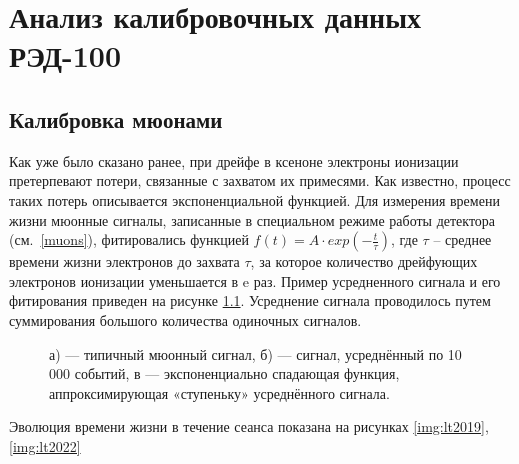 \chapter{Анализ калибровочных данных РЭД-100} 
\label{chapt3}

\section{Калибровка мюонами}
\label{sect3_1}
Как уже было сказано ранее, при дрейфе в ксеноне электроны ионизации претерпевают потери, связанные с захватом их примесями. Как известно, процесс таких потерь описывается экспоненциальной функцией. Для измерения времени жизни мюонные сигналы, записанные в специальном режиме работы детектора (см.~\ref{muons}), фитировались функцией $ f(t) = A\cdot exp(-\frac{t}{\tau})$, где $\tau$ -- среднее времени
жизни электронов до захвата $\tau$, за которое количество дрейфующих электронов ионизации уменьшается в e раз. Пример усредненного сигнала и его фитирования приведен на рисунке \ref{img:muonsignal}. Усреднение сигнала проводилось путем суммирования большого количества одиночных сигналов.
\begin{figure}[H]	
	\caption[Пример определения времени жизни электронов ионизации до захвата электроотрицательными примесями в жидком ксеноне.]{а) — типичный мюонный сигнал, б) — сигнал, усреднённый по 10 000 событий, в — экспоненциально спадающая функция, аппроксимирующая «ступеньку» усреднённого сигнала.}
	\label{img:muonsignal}
\end{figure}

Эволюция времени жизни в течение сеанса показана
на рисунках \ref{img:lt2019}, \ref{img:lt2022}

